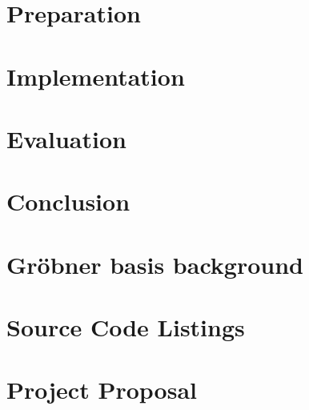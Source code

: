 \documentclass[a4paper,12pt,twoside,openany]{report}
\begin{document}
\chapter{Preparation}
\label{ch:preparation}


\chapter{Implementation}
\label{ch:implementation}


\chapter{Evaluation}
\label{ch:evaluation}


\chapter{Conclusion}
\label{ch:conclusion}



\printbibliography

\appendix

% 

\chapter{Gröbner basis background}
\label{ch:grobner}


\chapter{Source Code Listings}
\label{ch:appendix-code}


\chapter{Project Proposal}

\end{document}
